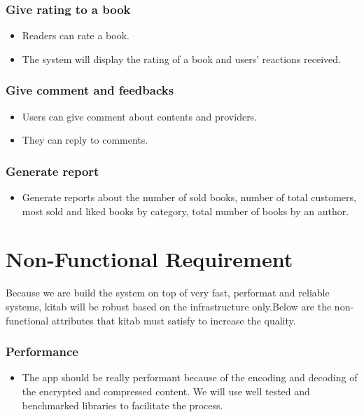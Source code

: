 	\subsubsection{Give rating to a book}
	\begin{itemize}
		\item Readers can rate a book.
		\item The system will display the rating of a book and users’ reactions received.
	\end{itemize}

	\subsubsection{Give comment and feedbacks}
	\begin{itemize}
		\item Users can give comment about contents and providers.
		\item They can reply to comments.
	\end{itemize}

	\subsubsection{Generate report}
	\begin{itemize}
		\item Generate reports about the number of sold books, number of total customers, most sold and liked books by category, total number of books by an author.
	\end{itemize}

\section{Non-Functional Requirement}

Because we are build the system on top of very fast, performat and reliable systems, kitab will be robust based on the infrastructure only.Below are the non-functional attributes that kitab must satisfy to increase the quality.

	\subsubsection{Performance}
	\begin{itemize}
		\item The app should be really performant because of the encoding and decoding of the encrypted and compressed content. We will use well tested and benchmarked libraries to facilitate the process. 
	\end{itemize}

